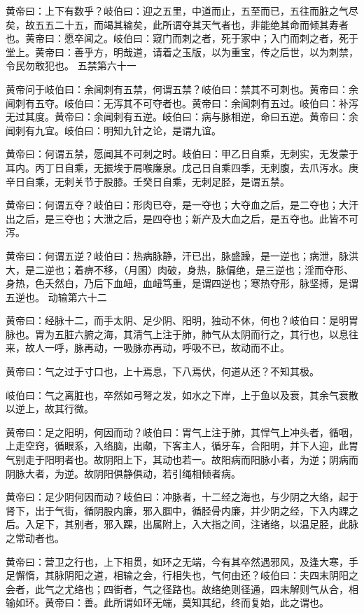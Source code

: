\documentclass[a4paper,12pt,UTF8,twoside]{ctexbook}
\begin{document}
	黄帝曰：上下有数乎？岐伯曰：迎之五里，中道而止，五至而已，五往而脏之气尽矣，故五五二十五，而竭其输矣，此所谓夺其天气者也，非能绝其命而倾其寿者也。黄帝曰：愿卒闻之。岐伯曰：窥门而刺之者，死于家中；入门而刺之者，死于堂上。黄帝曰：善乎方，明哉道，请着之玉版，以为重宝，传之后世，以为刺禁，令民勿敢犯也。
	五禁第六十一
	
	黄帝问于岐伯曰：余闻刺有五禁，何谓五禁？岐伯曰：禁其不可刺也。黄帝曰：余闻刺有五夺。岐伯曰：无泻其不可夺者也。黄帝曰：余闻刺有五过。岐伯曰：补泻无过其度。黄帝曰：余闻刺有五逆。岐伯曰：病与脉相逆，命曰五逆。黄帝曰：余闻刺有九宜。岐伯曰：明知九针之论，是谓九谊。
	
	黄帝曰：何谓五禁，愿闻其不可刺之时。岐伯曰：甲乙日自乘，无刺实，无发蒙于耳内。丙丁日自乘，无振埃于肩喉廉泉。戊己日自乘四季，无刺腹，去爪泻水。庚辛日自乘，无刺关节于股膝。壬癸日自乘，无刺足胫，是谓五禁。
	
	黄帝曰：何谓五夺？岐伯曰：形肉已夺，是一夺也；大夺血之后，是二夺也；大汗出之后，是三夺也；大泄之后，是四夺也；新产及大血之后，是五夺也。此皆不可泻。
	
	黄帝曰：何谓五逆？岐伯曰：热病脉静，汗已出，脉盛躁，是一逆也；病泄，脉洪大，是二逆也；着痹不移，（月囷）肉破，身热，脉偏绝，是三逆也；淫而夺形、身热，色夭然白，乃后下血衄，血衄笃重，是谓四逆也；寒热夺形，脉坚搏，是谓五逆也。
	动输第六十二
	
	黄帝曰：经脉十二，而手太阴、足少阴、阳明，独动不休，何也？岐伯曰：是明胃脉也。胃为五脏六腑之海，其清气上注于肺，肺气从太阴而行之，其行也，以息往来，故人一呼，脉再动，一吸脉亦再动，呼吸不已，故动而不止。
	
	黄帝曰：气之过于寸口也，上十焉息，下八焉伏，何道从还？不知其极。
	
	岐伯曰：气之离脏也，卒然如弓弩之发，如水之下岸，上于鱼以及衰，其余气衰散以逆上，故其行微。
	
	黄帝曰：足之阳明，何因而动？岐伯曰：胃气上注于肺，其悍气上冲头者，循咽，上走空窍，循眼系，入络脑，出顑，下客主人，循牙车，合阳明，并下人迎，此胃气别走于阳明者也。故阴阳上下，其动也若一。故阳病而阳脉小者，为逆；阴病而阴脉大者，为逆。故阴阳俱静俱动，若引绳相倾者病。
	
	黄帝曰：足少阴何因而动？岐伯曰：冲脉者，十二经之海也，与少阴之大络，起于肾下，出于气街，循阴股内廉，邪入腘中，循胫骨内廉，并少阴之经，下入内踝之后。入足下，其别者，邪入踝，出属附上，入大指之间，注诸络，以温足胫，此脉之常动者也。
	
	黄帝曰：营卫之行也，上下相贯，如环之无端，今有其卒然遇邪风，及逢大寒，手足懈惰，其脉阴阳之道，相输之会，行相失也，气何由还？岐伯曰：夫四末阴阳之会者，此气之尤络也；四街者，气之径路也。故络绝则径通，四末解则气从合，相输如环。黄帝曰：善。此所谓如环无端，莫知其纪，终而复始，此之谓也。
	
\end{document}
